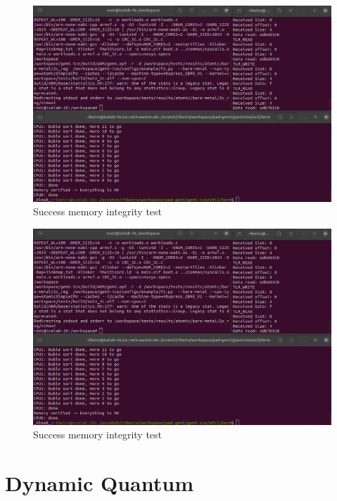\begin{figure}[H]
	\centering
 	\includegraphics[width=0.8\linewidth]{Images/Success_MemoryIntegrity.png}  %
 	\caption{Success memory integrity test}
\end{figure}

\begin{figure}[H]
	\centering
 	\includegraphics[width=0.8\linewidth]{Images/Success_MemoryIntegrity.png} 
 	\caption{Success memory integrity test}
\end{figure}



\section{Dynamic Quantum}


